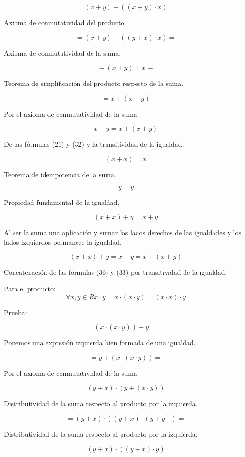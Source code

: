 \[{= {{({x + y})} + {({{({x + y})} \cdot x})}}} =\]

Axioma de conmutatividad del producto.

\[{= {{({x + y})} + {({{({y + x})} \cdot x})}}} =\]

Axioma de conmutatividad de la suma.

\[{= {{({x + y})} + x}} =\]

Teorema de simplificación del producto respecto de la suma.

\[= {x + {({x + y})}}\]

Por el axioma de conmutatividad de la suma.

\[{x + y} = {x + {({x + y})}}\]

De las fórmulas (21) y (32) y la transitividad de la igualdad.

\[{\left( {x + x} \right) = x}{}\]

Teorema de idempotencia de la suma.

\[y = y\]

Propiedad fundamental de la igualdad.

\[{{({x + x})} + y} = {x + y}\]

Al ser la suma una aplicación y sumar los lados derechos de las
igualdades y los lados izquierdos permanece la igualdad.

\[{}{{{{({x + x})} + y} = {x + y}} = {x + {({x + y})}}}\]

Concatenación de las fórmulas (36) y (33) por transitividad de la
igualdad.

Para el
producto:\[\forall x,{y \in B}{{{x \cdot y} = {x \cdot {({x \cdot y})}}} = {{({x \cdot x})} \cdot y}}\]

Prueba:

\[{{({x \cdot {({x \cdot y})}})} + y} = {}\]

Ponemos una expresión izquierda bien formada de una igualdad.

\[{= {y + {({x \cdot {({x \cdot y})}})}}} =\]

Por el axioma de conmutatividad de la suma.

\[{= {{({y + x})} \cdot {({y + {({x \cdot y})}})}}} =\]

Distributividad de la suma respecto al producto por la izquierda.

\[{= {{({y + x})} \cdot {({{({y + x})} \cdot {({y + y})}})}}} =\]

Distributividad de la suma respecto al producto por la izquierda.

\[{= {{({y + x})} \cdot {({{({y + x})} \cdot y})}}} =\]

